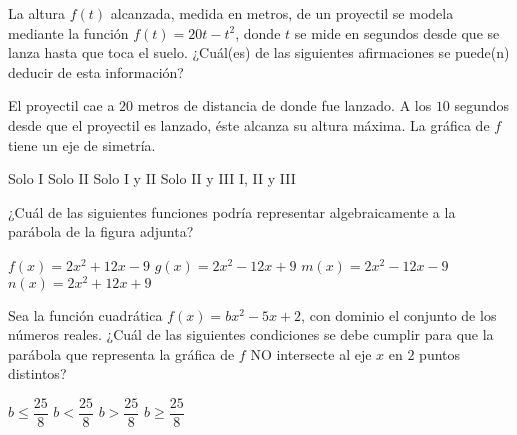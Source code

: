 \documentclass[
  titulo=Tarea,
  subtitulo=Álgebra y funciones,
  curso=Tercero medio,
  con nombre,
]{srs3}
\begin{document}
\begin{preguntas}
\pregunta La altura \(f\left(t\right)\) alcanzada, medida en metros, de un proyectil se modela mediante la función \(f\left(t\right)=20t-t^2\), donde \(t\) se mide en segundos desde que se lanza hasta que toca el suelo. ¿Cuál(es) de las siguientes afirmaciones se puede(n) deducir de esta información?
\begin{opciones}
\opcion El proyectil cae a \(20\) metros de distancia de donde fue lanzado.
\opcion A los \(10\) segundos desde que el proyectil es lanzado, éste alcanza su altura máxima.
\opcion La gráfica de \(f\) tiene un eje de simetría.
\end{opciones}
\begin{alternativas}
\alternativa Solo I
\alternativa Solo II
\alternativa Solo I y II
\alternativa Solo II y III
\alternativa I, II y III
\end{alternativas}

\pregunta ¿Cuál de las siguientes funciones podría representar algebraicamente a la parábola de la figura adjunta?
\begin{columnas}[0.6][c]
\begin{alternativas}
\alternativa \( f\left(x\right)=2x^2+12x-9 \)
\alternativa \( g\left(x\right)=2x^2-12x+9 \)
\alternativa \( m\left(x\right)=2x^2-12x-9 \)
\alternativa \( n\left(x\right)=2x^2+12x+9 \)
\end{alternativas}
\siguiente
{}
\end{columnas}

\pregunta Sea la función cuadrática \( f\left(x\right)=bx^2-5x+2 \), con dominio el conjunto de los números reales. ¿Cuál de las siguientes condiciones se debe cumplir para que la parábola que representa la gráfica de \(f\) NO intersecte al eje \(x\) en \(2\) puntos distintos?
\begin{alternativas}
\alternativa \( b \leq \dfrac{25}{8} \)
\alternativa \( b < \dfrac{25}{8} \)
\alternativa \( b > \dfrac{25}{8} \)
\alternativa \( b \geq \dfrac{25}{8} \)
\end{alternativas}


\end{preguntas}
\end{document}

